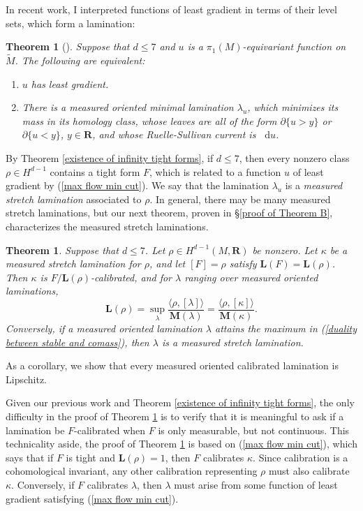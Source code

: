 \documentclass[reqno,11pt]{amsart}
\newcommand{\RR}{\mathbf{R}}
\newcommand*\dif{\mathop{}\!\mathrm{d}}
\newcommand{\Mass}{\mathbf M}
\newcommand{\Comass}{\mathbf L}
\newcommand{\dfn}[1]{\emph{#1}\index{#1}}
\newtheorem{theorem}{Theorem}[section]
\newtheorem{mainthm}{Theorem}
\theoremstyle{definition}
\numberwithin{equation}{section}
\begin{document}
In recent work, I interpreted functions of least gradient in terms of their level sets, which form a lamination:

\begin{theorem}[{\cite{BackusCML}}]\label{1 harmonic is MOML}
Suppose that $d \leq 7$ and $u$ is a $\pi_1(M)$-equivariant function on $\tilde M$.
The following are equivalent:
\begin{enumerate}
\item $u$ has least gradient.
\item There is a measured oriented minimal lamination $\lambda_u$, which minimizes its mass in its homology class, whose leaves are all of the form $\partial \{u > y\}$ or $\partial \{u < y\}$, $y \in \RR$, and whose Ruelle-Sullivan current is $\dif u$.
\end{enumerate}
\end{theorem}

By Theorem \ref{existence of infinity tight forms}, if $d \leq 7$, then every nonzero class $\rho \in H^{d - 1}$ contains a tight form $F$, which is related to a function $u$ of least gradient by (\ref{max flow min cut}).
We say that the lamination $\lambda_u$ is a \dfn{measured stretch lamination} associated to $\rho$.
In general, there may be many measured stretch laminations, but our next theorem, proven in \S\ref{proof of Theorem B}, characterizes the measured stretch laminations.

\begin{mainthm}\label{lams are calibrated}
Suppose that $d \leq 7$.
Let $\rho \in H^{d - 1}(M, \RR)$ be nonzero.
Let $\kappa$ be a measured stretch lamination for $\rho$, and let $[F] = \rho$ satisfy $\Comass(F) = \Comass(\rho)$.
Then $\kappa$ is $F/\Comass(\rho)$-calibrated, and for $\lambda$ ranging over measured oriented laminations,
\begin{equation}\label{duality between stable and comass}
\Comass(\rho) = \sup_\lambda \frac{\langle \rho, [\lambda]\rangle}{\Mass(\lambda)} = \frac{\langle \rho, [\kappa]\rangle}{\Mass(\kappa)}.
\end{equation}
Conversely, if a measured oriented lamination $\lambda$ attains the maximum in (\ref{duality between stable and comass}), then $\lambda$ is a measured stretch lamination.
\end{mainthm}

As a corollary, we show that every measured oriented calibrated lamination is Lipschitz.

Given our previous work \cite{BackusCML} and Theorem \ref{existence of infinity tight forms}, the only difficulty in the proof of Theorem \ref{lams are calibrated} is to verify that it is meaningful to ask if a lamination be $F$-calibrated when $F$ is only measurable, but not continuous.
This technicality aside, the proof of Theorem \ref{lams are calibrated} is based on (\ref{max flow min cut}), which says that if $F$ is tight and $\Comass(\rho) = 1$, then $F$ calibrates $\kappa$.
Since calibration is a cohomological invariant, any other calibration representing $\rho$ must also calibrate $\kappa$.
Conversely, if $F$ calibrates $\lambda$, then $\lambda$ must arise from some function of least gradient satisfying (\ref{max flow min cut}).
\end{document}
